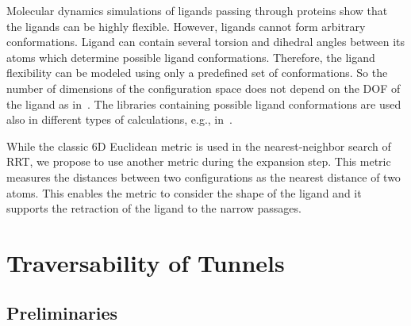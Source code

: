 \documentclass[usletter, 10pt, conference]{ieeeconf} %
\begin{document}
{Molecular dynamics simulations of ligands passing through proteins show that the ligands can be highly flexible.
However, ligands cannot form arbitrary conformations. 
Ligand can contain several torsion and dihedral angles between its atoms which determine possible ligand conformations.
Therefore, the ligand flexibility can be modeled using only a predefined set of conformations.
So the number of dimensions of the configuration space does not depend on the DOF of the ligand as in~\cite{cortes2010simulating}.
The libraries containing possible ligand conformations are used also in different types of calculations, e.g., in~\cite{kellogg}. 

While the classic 6D Euclidean metric is used in the nearest-neighbor search of RRT, we propose to use another metric during the expansion step.
This metric measures the distances between two configurations as the nearest distance of two atoms. 
This enables the metric to consider the shape of the ligand and it supports the retraction of the ligand to the narrow passages.




\section{Traversability of Tunnels}

\subsection{Preliminaries}

}
\end{document}
